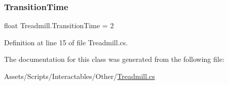 \subsubsection{\texorpdfstring{Transition\+Time}{TransitionTime}}
{\footnotesize\ttfamily float Treadmill.\+Transition\+Time = 2}



Definition at line 15 of file Treadmill.\+cs.



The documentation for this class was generated from the following file\+:\begin{DoxyCompactItemize}
\item 
Assets/\+Scripts/\+Interactables/\+Other/\mbox{\hyperlink{_treadmill_8cs}{Treadmill.\+cs}}\end{DoxyCompactItemize}
